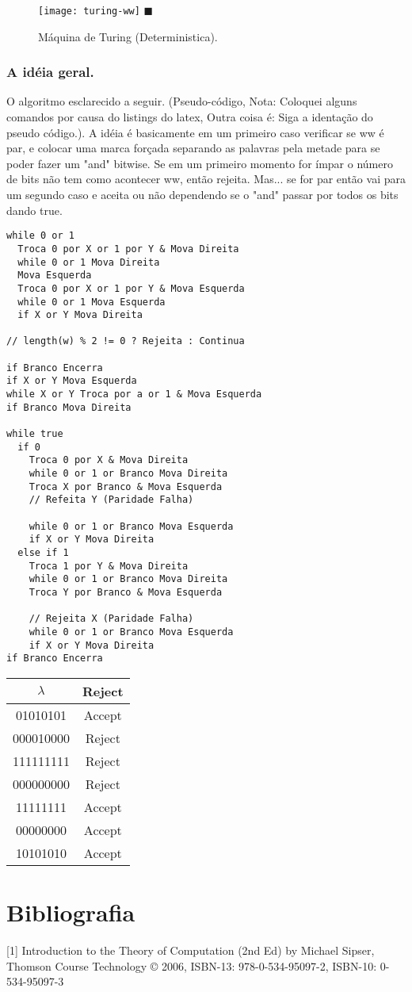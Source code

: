 \documentclass[12pt, a4paper]{article}
\begin{document}
\begin{figure}[ht]
\centering
\texttt{[image: turing-ww]} \flushright $\blacksquare$
\caption{Máquina de Turing (Deterministica).}
\end{figure}


\subsubsection{A idéia geral.}
\qquad O algoritmo esclarecido a seguir. (Pseudo-código, Nota: Coloquei alguns comandos por causa do listings do latex, Outra coisa é: Siga a identação do pseudo código.). A idéia é basicamente em um primeiro caso verificar se ww é par, e colocar uma marca forçada separando as palavras pela metade para se poder fazer um "and" bitwise. Se em um primeiro momento for ímpar o número de bits não tem como acontecer ww, então rejeita. Mas... se for par então vai para um segundo caso e aceita ou não dependendo se o "and" passar por todos os bits dando true.

\pagebreak
\begin{lstlisting}
while 0 or 1
  Troca 0 por X or 1 por Y & Mova Direita
  while 0 or 1 Mova Direita
  Mova Esquerda
  Troca 0 por X or 1 por Y & Mova Esquerda
  while 0 or 1 Mova Esquerda
  if X or Y Mova Direita

// length(w) % 2 != 0 ? Rejeita : Continua

if Branco Encerra
if X or Y Mova Esquerda
while X or Y Troca por a or 1 & Mova Esquerda
if Branco Mova Direita

while true
  if 0
    Troca 0 por X & Mova Direita
    while 0 or 1 or Branco Mova Direita
    Troca X por Branco & Mova Esquerda
    // Refeita Y (Paridade Falha)

    while 0 or 1 or Branco Mova Esquerda
    if X or Y Mova Direita
  else if 1
    Troca 1 por Y & Mova Direita
    while 0 or 1 or Branco Mova Direita
    Troca Y por Branco & Mova Esquerda

    // Rejeita X (Paridade Falha)
    while 0 or 1 or Branco Mova Esquerda
    if X or Y Mova Direita
if Branco Encerra
\end{lstlisting}

\begin{tabular}{|c|c|}
  \hline $\lambda$  & Reject \\
  \hline 01010101   & Accept \\
  \hline 000010000  & Reject \\
  \hline 111111111  & Reject \\
  \hline 000000000  & Reject \\
  \hline 11111111   & Accept \\
  \hline 00000000   & Accept \\
  \hline 10101010   & Accept \\
  \hline
\end{tabular}


\pagebreak
\section{Bibliografia}

[1] Introduction to the Theory of Computation (2nd Ed) by Michael Sipser, Thomson Course Technology © 2006, ISBN-13: 978-0-534-95097-2, ISBN-10: 0-534-95097-3
\end{document}
